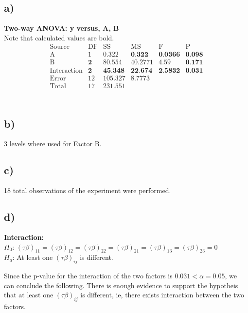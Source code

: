 \documentclass{article}
\begin{document}
\subsection*{a)}
\textbf{Two-way ANOVA: y versus, A, B} \\
Note that calculated values are bold.
\begin{equation*}
\begin{array}{c|c|c|c|c|c}
    \text{Source} &\text{DF}& \text{SS} & \text{MS} & \text{F} &\text{P}  \\
    \hline
    \text{A}            & \text{1}   & \text{0.322}   & \textbf{0.322}      & \textbf{0.0366}  &\textbf{0.098}  \\
    \text{B}            & \textbf{2} & \text{80.554}  & \text{40.2771}  & \text{4.59} &\textbf{0.171}  \\
    \text{Interaction}  & \textbf{2} & \textbf{45.348}     & \textbf{22.674}      & \textbf{2.5832}  &\textbf{0.031}  \\
    \text{Error}        & \text{12}  & \text{105.327} & \text{8.7773}   &   &  \\
    \text{Total}        & \text{17}  & \text{231.551} &  &  &  \\

\end{array}
\end{equation*}\\

\subsection*{b)}
3 levels where used for Factor B.
\subsection*{c)}
18 total observations of the experiment were performed.
\subsection*{d)}
\begin{flushleft}
    \textbf{Interaction:} \\
    $H_0$: $(\tau \beta)_{11} = (\tau \beta)_{12} = (\tau \beta)_{22} = (\tau \beta)_{21} = (\tau \beta)_{13} = (\tau \beta)_{23} = 0$ \\
    $H_a$: At least one $(\tau \beta)_{ij}$ is different.\\
\end{flushleft}

Since the p-value for the interaction of the two factors is $0.031 < \alpha = 0.05$, we can conclude the following.
There is enough evidence to support the hypotheis that at least one $(\tau \beta)_{ij}$ is different,
ie, there exists interaction between the two factors.
\end{document}
